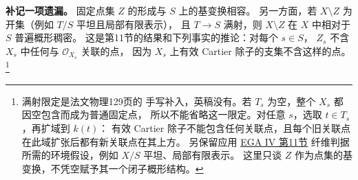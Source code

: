 \documentclass[openany,fontset=fandol]{ctexbook}
\newcommand{\OO}{\mathcal O}
\begin{document}
\medskip
\noindent\textbf{补记一项遗漏。}
固定点集 \(Z\) 的形成与 \(S\) 上的基变换相容。
另一方面，若 \(X\setminus Z\) 为开集（例如 \(T/S\) 平坦且局部有限表示），
且 \(T\to S\) 满射，则 \(X\setminus Z\) 在 \(X\) 中相对于 \(S\) 普遍概形稠密。
这是第11节的结果和下列事实的推论：对每个 \(s\in S\)，
\(Z_s\) 不含 \(X_s\) 中任何与 \(\OO_{X_s}\) 关联的点，
因为 \(X_s\) 上有效 Cartier 除子的支集不含这样的点。\footnote{满射限定是法文物理129页的
手写补入，英稿没有。若 \(T_s\) 为空，整个 \(X_s\) 都因空包含而成为普通固定点，
所以不能省略这一限定。对任意 \(s\)，选取 \(t\in T_s\)，再扩域到 \(k(t)\)：
有效 Cartier 除子不能包含任何关联点，且每个旧关联点在此域扩张后都有新关联点在其上方。
另保留应用 \href{https://numdam.org/item/PMIHES_1966__28__5_0/}{EGA IV 第11节}
纤维判据所需的环境假设，例如 \(X/S\) 平坦、局部有限表示。
这里只谈 \(Z\) 作为点集的基变换，不凭空赋予其一个闭子概形结构。}
\end{document}
